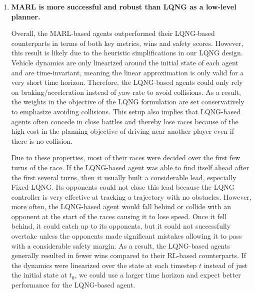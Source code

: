 \begin{enumerate}[wide, labelindent=0pt, font=\bfseries]
\item \textbf{MARL is more successful and robust than LQNG as a low-level planner.}  

Overall, the MARL-based agents outperformed their LQNG-based counterparts in terms of both key metrics, wins and safety scores. However, this result is likely due to the heuristic simplifications in our LQNG design. Vehicle dynamics are only linearized around the initial state of each agent and are time-invariant, meaning the linear approximation is only valid for a very short time horizon. Therefore, the LQNG-based agents could only rely on braking/acceleration instead of yaw-rate to avoid collisions. As a result, the weights in the objective of the LQNG formulation are set conservatively to emphasize avoiding collisions. This setup also implies that LQNG-based agents often concede in close battles and thereby lose races because of the high cost in the planning objective of driving near another player even if there is no collision. 

Due to these properties, most of their races were decided over the first few turns of the race. If the LQNG-based agent was able to find itself ahead after the first several turns, then it usually built a considerable lead, especially Fixed-LQNG. Its opponents could not close this lead because the LQNG controller is very effective at tracking a trajectory with no obstacles. However, more often, the LQNG-based agent would fall behind or collide with an opponent at the start of the races causing it to lose speed. Once it fell behind, it could catch up to its opponents, but it could not successfully overtake unless the opponents made significant mistakes allowing it to pass with a considerable safety margin. As a result, the LQNG-based agents generally resulted in fewer wins compared to their RL-based counterparts. If the dynamics were linearized over the state at each timestep $t$ instead of just the initial state at $t_0$, we could use a larger time horizon and expect better performance for the LQNG-based agent. 


\end{enumerate}
